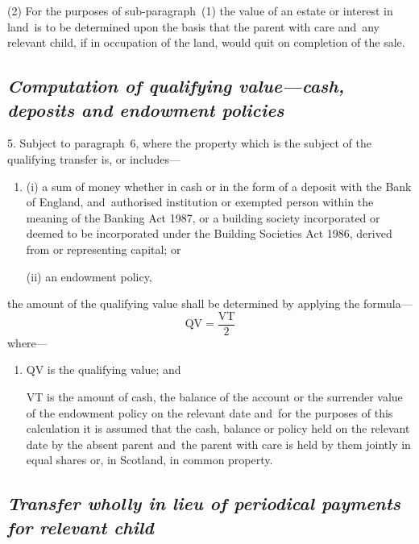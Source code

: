 \documentclass[12pt,a4paper]{article}
\begin{document}
(2) For the purposes of sub-paragraph~(1) the value of an estate or interest in land~is to be determined upon the basis that the parent with care and~any relevant child, if in occupation of the land, would quit on completion of the sale.


\subsection*{\itshape Computation of qualifying value—cash, deposits and endowment policies}

5.  Subject to paragraph~6, where the property which is the subject of the qualifying transfer is, or includes—
\begin{enumerate}\item[]
(i) a sum of money whether in cash or in the form of a deposit with the Bank of England, and~authorised institution or exempted person within the meaning of the Banking Act 1987, or a building society incorporated or deemed to be incorporated under the Building Societies Act 1986, derived from or representing capital; or

(ii) an endowment policy,
\end{enumerate}
the amount of the qualifying value shall be determined by applying the formula—
\[ \mathrm{QV} = \frac{\mathrm{VT}}{2}\]
where—
\begin{enumerate}\item[]
QV is the qualifying value; and

VT is the amount of cash, the balance of the account or the surrender value of the endowment policy on the relevant date
and~for the purposes of this calculation it is assumed that the cash, balance or policy held on the relevant date by the absent parent and~the parent with care is held by them jointly in equal shares or, in Scotland, in common property.  %
\end{enumerate}


\subsection*{\sloppy\itshape Transfer wholly in lieu of periodical payments for relevant child}
\end{document}
